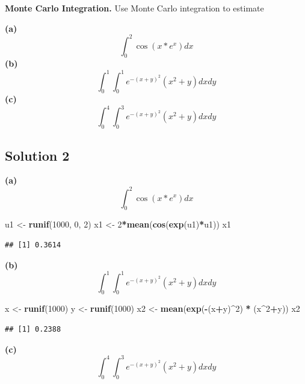 \documentclass[
]{article}
\newenvironment{Shaded}{\begin{snugshade}}{\end{snugshade}}
\newcommand{\DecValTok}[1]{\textcolor[rgb]{0.00,0.00,0.81}{#1}}
\newcommand{\KeywordTok}[1]{\textcolor[rgb]{0.13,0.29,0.53}{\textbf{#1}}}
\newcommand{\NormalTok}[1]{#1}
\newcommand{\OperatorTok}[1]{\textcolor[rgb]{0.81,0.36,0.00}{\textbf{#1}}}
\newcommand{\StringTok}[1]{\textcolor[rgb]{0.31,0.60,0.02}{#1}}
\begin{document}
\textbf{Monte Carlo Integration.} Use Monte Carlo integration to
estimate

\textbf{(a)} \[\int_{0}^{2} \cos(x*e^x) dx\] \textbf{(b)}
\[\int_{0}^{1}\int_{0}^{1} e^{-(x+y)^2}(x^2+y) dx dy\] \textbf{(c)}
\[\int_{0}^{4}\int_{0}^{3} e^{-(x+y)^2}(x^2+y) dx dy\]

\hypertarget{solution-2}{%
\subsection{Solution 2}\label{solution-2}}

\textbf{(a)} \[\int_{0}^{2} \cos(x*e^x) dx\]

\begin{Shaded}
\begin{Highlighting}[]
\NormalTok{u1 <-}\StringTok{ }\KeywordTok{runif}\NormalTok{(}\DecValTok{1000}\NormalTok{, }\DecValTok{0}\NormalTok{, }\DecValTok{2}\NormalTok{)}
\NormalTok{x1 <-}\StringTok{ }\DecValTok{2}\OperatorTok{*}\KeywordTok{mean}\NormalTok{(}\KeywordTok{cos}\NormalTok{(}\KeywordTok{exp}\NormalTok{(u1)}\OperatorTok{*}\NormalTok{u1))}
\NormalTok{x1}
\end{Highlighting}
\end{Shaded}

\begin{verbatim}
## [1] 0.3614
\end{verbatim}

\textbf{(b)} \[\int_{0}^{1}\int_{0}^{1} e^{-(x+y)^2}(x^2+y) dx dy\]

\begin{Shaded}
\begin{Highlighting}[]
\NormalTok{x <-}\StringTok{ }\KeywordTok{runif}\NormalTok{(}\DecValTok{1000}\NormalTok{)}
\NormalTok{y <-}\StringTok{ }\KeywordTok{runif}\NormalTok{(}\DecValTok{1000}\NormalTok{)}
\NormalTok{x2 <-}\StringTok{ }\KeywordTok{mean}\NormalTok{(}\KeywordTok{exp}\NormalTok{(}\OperatorTok{-}\NormalTok{(x}\OperatorTok{+}\NormalTok{y)}\OperatorTok{^}\DecValTok{2}\NormalTok{) }\OperatorTok{*}\StringTok{ }\NormalTok{(x}\OperatorTok{^}\DecValTok{2}\OperatorTok{+}\NormalTok{y))}
\NormalTok{x2}
\end{Highlighting}
\end{Shaded}

\begin{verbatim}
## [1] 0.2388
\end{verbatim}

\textbf{(c)} \[\int_{0}^{4}\int_{0}^{3} e^{-(x+y)^2}(x^2+y) dx dy\]
\end{document}
